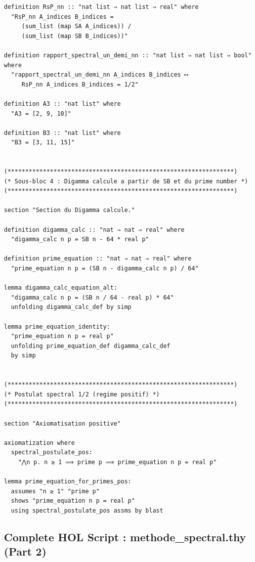 \documentclass[a4paper,11pt]{article}
\begin{document}
\begin{holcode}[title={\textcolor{white}{File: methode\_spectral.thy -- Part 1/4}}]
\begin{lstlisting}
definition RsP_nn :: "nat list ⇒ nat list ⇒ real" where
  "RsP_nn A_indices B_indices =
     (sum_list (map SA A_indices)) /
     (sum_list (map SB B_indices))"

definition rapport_spectral_un_demi_nn :: "nat list ⇒ nat list ⇒ bool" where
  "rapport_spectral_un_demi_nn A_indices B_indices ⟷
     RsP_nn A_indices B_indices = 1/2"

definition A3 :: "nat list" where
  "A3 = [2, 9, 10]"

definition B3 :: "nat list" where
  "B3 = [3, 11, 15]"


(****************************************************************)
(* Sous-bloc 4 : Digamma calcule a partir de SB et du prime number *)
(****************************************************************)

section "Section du Digamma calcule."

definition digamma_calc :: "nat ⇒ nat ⇒ real" where
  "digamma_calc n p = SB n - 64 * real p"

definition prime_equation :: "nat ⇒ nat ⇒ real" where
  "prime_equation n p = (SB n - digamma_calc n p) / 64"

lemma digamma_calc_equation_alt:
  "digamma_calc n p = (SB n / 64 - real p) * 64"
  unfolding digamma_calc_def by simp

lemma prime_equation_identity:
  "prime_equation n p = real p"
  unfolding prime_equation_def digamma_calc_def
  by simp


(****************************************************************)
(* Postulat spectral 1/2 (regime positif) *)
(****************************************************************)

section "Axiomatisation positive"

axiomatization where
  spectral_postulate_pos:
    "⋀n p. n ≥ 1 ⟹ prime p ⟹ prime_equation n p = real p"

lemma prime_equation_for_primes_pos:
  assumes "n ≥ 1" "prime p"
  shows "prime_equation n p = real p"
  using spectral_postulate_pos assms by blast
\end{lstlisting}
\end{holcode}

\newpage
\subsection{Complete HOL Script : methode\_spectral.thy (Part 2)}
\end{document}
